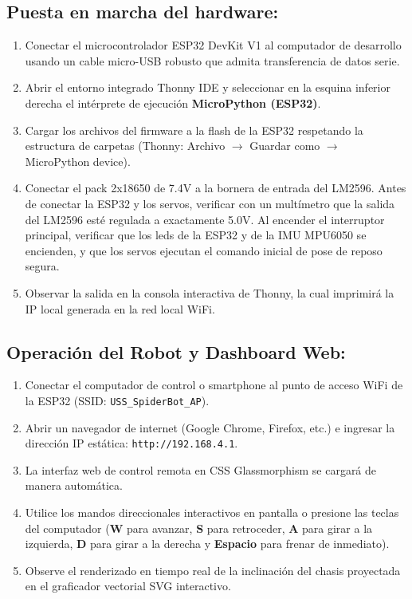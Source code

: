 \documentclass[12pt]{article}
\newcommand{\codigo}[1]{\texttt{#1}}
\begin{document}
\subsection{Puesta en marcha del hardware:}
\begin{enumerate}
    \item Conectar el microcontrolador ESP32 DevKit V1 al computador de desarrollo usando un cable micro-USB robusto que admita transferencia de datos serie.
    \item Abrir el entorno integrado Thonny IDE y seleccionar en la esquina inferior derecha el intérprete de ejecución \textbf{MicroPython (ESP32)}.
    \item Cargar los archivos del firmware a la flash de la ESP32 respetando la estructura de carpetas (Thonny: Archivo $\rightarrow$ Guardar como $\rightarrow$ MicroPython device).
    \item Conectar el pack 2x18650 de 7.4V a la bornera de entrada del LM2596. Antes de conectar la ESP32 y los servos, verificar con un multímetro que la salida del LM2596 esté regulada a exactamente 5.0V. Al encender el interruptor principal, verificar que los leds de la ESP32 y de la IMU MPU6050 se encienden, y que los servos ejecutan el comando inicial de pose de reposo segura.
    \item Observar la salida en la consola interactiva de Thonny, la cual imprimirá la IP local generada en la red local WiFi.
\end{enumerate}

\subsection{Operación del Robot y Dashboard Web:}
\begin{enumerate}
    \item Conectar el computador de control o smartphone al punto de acceso WiFi de la ESP32 (SSID: \codigo{USS\_SpiderBot\_AP}).
    \item Abrir un navegador de internet (Google Chrome, Firefox, etc.) e ingresar la dirección IP estática: \texttt{http://192.168.4.1}.
    \item La interfaz web de control remota en CSS Glassmorphism se cargará de manera automática.
    \item Utilice los mandos direccionales interactivos en pantalla o presione las teclas del computador (\textbf{W} para avanzar, \textbf{S} para retroceder, \textbf{A} para girar a la izquierda, \textbf{D} para girar a la derecha y \textbf{Espacio} para frenar de inmediato).
    \item Observe el renderizado en tiempo real de la inclinación del chasis proyectada en el graficador vectorial SVG interactivo.
\end{enumerate}
\end{document}
